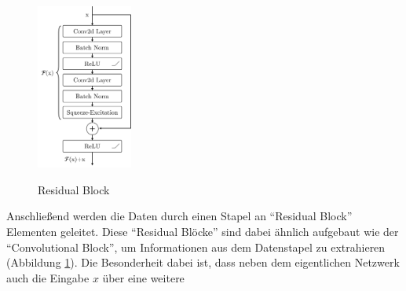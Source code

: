 \begin{figure}
    \vspace*{-0.375cm}
    \centering
    \includegraphics[width=0.28\textwidth]{res/pictures/res-block.pdf}
    \vspace*{-5pt}
    \caption[Residual Block]{\unskip}
    Residual Block
    \label{fig:resblock}
    \vspace*{-2.5cm}
\end{figure}

Anschließend werden die Daten durch einen Stapel an \enquote{Residual Block} Elementen geleitet. Diese \enquote{Residual Blöcke} sind dabei ähnlich aufgebaut wie der \enquote{Convolutional Block}, um Informationen aus dem Datenstapel zu extrahieren (Abbildung \ref{fig:resblock}). Die Besonderheit dabei ist, dass neben dem eigentlichen Netzwerk auch die Eingabe $x$ über eine weitere


